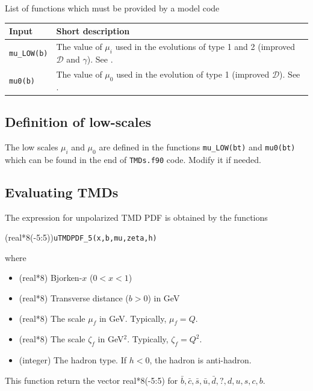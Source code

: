 \documentclass[prd,nofootinbib,eqsecnum,final]{revtex4}
\renewcommand{\(}{\left(}
\renewcommand{\)}{\right)}
\renewcommand{\[}{\left[}
\renewcommand{\]}{\right]}
\begin{document}
\begin{center}
\\
~
\\
List of functions which must be provided by a model code
\\
\begin{tabular}{||l|l||}
\hline\hline
Input &  Short description
\\\hline
\texttt{mu{\_}LOW(b)} & The value of $\mu_i$ used in the evolutions of type 1 and 2 (improved $\mathcal{D}$ and $\gamma$). See \cite{Scimemi:2018xaf}.
\\\hline
\texttt{mu0(b)}& The value of $\mu_0$ used in the evolution of type 1 (improved $\mathcal{D}$). See \cite{Scimemi:2018xaf}.
\\
\hline\hline
\end{tabular}
\end{center}

\subsection{Definition of low-scales}
\label{TMDs:mus}

The low scales $\mu_i$ and $\mu_0$ are defined in the functions \texttt{mu{\_}LOW(bt)} and \texttt{mu0(bt)} which can be found in the end of \texttt{TMDs.f90} code. Modify it if needed.



\subsection{Evaluating TMDs}
\label{TMDs:TMDs}

The expression for unpolarized TMD PDF is obtained by the functions

(real*8(-5:5))\texttt{uTMDPDF{\_}5(x,b,mu,zeta,h)}

where 
\begin{itemize}
\item [\texttt{x}] (real*8) Bjorken-$x$ ($0<x<1$)
\item [\texttt{b}] (real*8) Transverse distance ($b>0$) in GeV
\item [\texttt{mu}] (real*8) The scale $\mu_f$ in GeV. Typically, $\mu_f=Q$.
\item [\texttt{zeta}] (real*8) The scale $\zeta_f$ in GeV$^2$. Typically, $\zeta_f=Q^2$.
\item [\texttt{h}] (integer) The hadron type. If $h<0$, the hadron is anti-hadron.
\end{itemize}
This function return the vector real*8(-5:5) for $\bar b, \bar c, \bar s,\bar u,\bar d ,?,d,u,s, c, b$.
\end{document}
